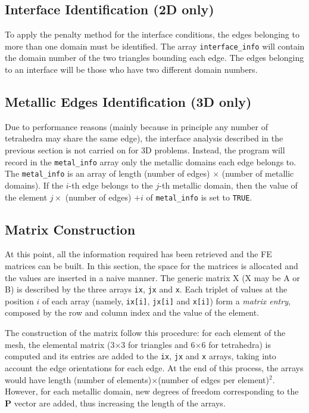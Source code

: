 \documentclass[11pt,a4paper,oneside]{article}
\begin{document}
\subsection{Interface Identification (2D only)}
To apply the penalty method for the interface conditions, the edges belonging to more than one domain must be identified. The array {\tt interface\_info} will contain the domain number of the two triangles bounding each edge. The edges belonging to an interface will be those who have two different domain numbers.

\subsection{Metallic Edges Identification (3D only)}
Due to performance reasons (mainly because in principle any number of tetrahedra may share the same edge), the  interface analysis described in the previous section is not carried on for 3D problems. Instead, the program will record in the {\tt metal\_info} array only the metallic domains each edge belongs to. The {\tt metal\_info} is an array of length (number of edges) $\times$ (number of metallic domains). If the $i$-th edge belongs to the $j$-th metallic domain, then the value of the element $j \times$ (number of edges) $ + i$ of {\tt metal\_info} is set to {\tt TRUE}.

\subsection{Matrix Construction}
At this point, all the information required has been retrieved and the FE matrices can be built. In this section, the space for the matrices is allocated and the values are inserted in a naive manner. The generic matrix X (X may be A or B) is described by the three arrays {\tt ix}, {\tt jx} and {\tt x}. Each triplet of values at the position $i$ of each array (namely, {\tt ix[i]}, {\tt jx[i]} and {\tt x[i]}) form a {\it matrix entry}, composed by the row and column index and the value of the element.

The construction of the matrix follow this procedure: for each element of the mesh, the elemental matrix (3$\times$3 for triangles and 6$\times$6 for tetrahedra) is computed and its entries are added to the {\tt ix}, {\tt jx} and {\tt x} arrays, taking into account the edge orientations for each edge. At the end of this process, the arrays would have length (number of elements)$\times$(number of edges per element)$^2$. However, for each metallic domain, new degrees of freedom corresponding to the $\boldsymbol{P}$ vector are added, thus increasing the length of the arrays.
\end{document}
